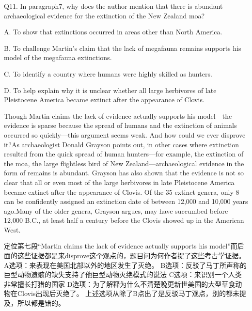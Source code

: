 \begin{blk}
    \begin{qst}
        Q11.
        In paragraph7, why does the author mention that there is abundant archaeological evidence for the extinction of the New Zealand moa?
    \end{qst}

    \begin{chc}
        A.
        To show that extinctions occurred in areas other than North America.

        B.
        To challenge Martin's claim that the lack of megafauna remains supports his model of the megafauna extinctions.

        C.
        To identify a country where humans were highly skilled as hunters.

        D.
        To help explain why it is unclear whether all large herbivores of late Pleistocene America became extinct after the appearance of Clovis.
    \end{chc}

    \begin{psgq}
        Though Martin claims the lack of evidence actually supports his model—the evidence is sparse because the spread of humans and the extinction of animals occurred so quickly—this argument seems weak. And how could we ever disprove it?As archaeologist Donald Grayson points out, in other cases where extinction resulted from the quick spread of human hunters—for example, the extinction of the moa, the large flightless bird of New Zealand—archaeological evidence in the form of remains is abundant. Grayson has also shown that the evidence is not so clear that all or even most of the large herbivores in late Pleistocene America became extinct after the appearance of Clovis. Of the 35 extinct genera, only 8 can be confidently assigned an extinction date of between 12,000 and 10,000 years ago.Many of the older genera, Grayson argues, may have succumbed before 12,000 B.C., at least half a century before the Clovis showed up in the American West.
    \end{psgq}

    \begin{nlz}
        定位第七段“Martin claims the lack of evidence actually supports his model”而后面的这些证据都是来disprove这个观点的，题目问为何作者提了这些考古学证据。 A选项：来表现在美国北部以外的地区发生了灭绝。 B选项：反驳了马丁所声称的巨型动物遗骸的缺失支持了他巨型动物灭绝模式的说法 C选项：来识别一个人类非常擅长打猎的国家 D选项：为了解释为什么不清楚晚更新世美国的大型草食动物在Clovis出现后灭绝了。 上述选项从除了B点出了是反驳马丁观点，别的都未提及，所以都是错的。
    \end{nlz}
\end{blk}

